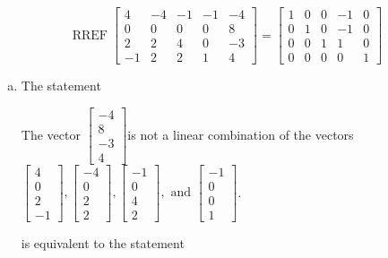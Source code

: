 \begin{exerciseAnswer} 
\[\operatorname{RREF}  \left[\begin{array}{cccc|c}
4 & -4 & -1 & -1 & -4 \\
0 & 0 & 0 & 0 & 8 \\
2 & 2 & 4 & 0 & -3 \\
-1 & 2 & 2 & 1 & 4
\end{array}\right] = \left[\begin{array}{cccc|c}
1 & 0 & 0 & -1 & 0 \\
0 & 1 & 0 & -1 & 0 \\
0 & 0 & 1 & 1 & 0 \\
0 & 0 & 0 & 0 & 1
\end{array}\right] \]
\begin{enumerate}[(a)]
\item  The statement 
\begin{center}\begin{minipage}{0.8\textwidth}
 The vector \( \left[\begin{array}{c}
-4 \\
8 \\
-3 \\
4
\end{array}\right] \)is not a linear combination of the vectors \( \left[\begin{array}{c}
4 \\
0 \\
2 \\
-1
\end{array}\right] , \left[\begin{array}{c}
-4 \\
0 \\
2 \\
2
\end{array}\right] , \left[\begin{array}{c}
-1 \\
0 \\
4 \\
2
\end{array}\right] , \text{ and } \left[\begin{array}{c}
-1 \\
0 \\
0 \\
1
\end{array}\right] \). 
\end{minipage}\end{center}
     is equivalent to the statement 
\begin{center}\begin{minipage}{0.8\textwidth}

\end{minipage}
\end{center}
\end{enumerate}
\end{exerciseAnswer}

